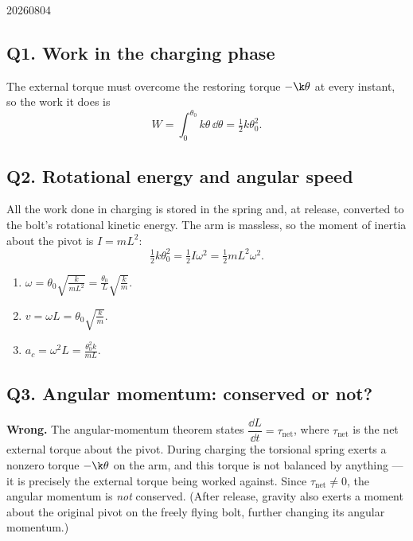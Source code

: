 \begin{solution}{20260804}

\subsection*{Q1. Work in the charging phase}

The external torque must overcome the restoring torque $-\k\theta$ at every instant, so the work it does is
\[
  W = \int_{0}^{\theta_{0}} k\theta \,\dd\theta
    = \boxed{\tfrac{1}{2}k\theta_{0}^{2}}.
\]

\subsection*{Q2. Rotational energy and angular speed}

All the work done in charging is stored in the spring and, at release, converted to the bolt's rotational kinetic energy.  The arm is massless, so the moment of inertia about the pivot is $I = mL^{2}$:
\[
  \tfrac{1}{2}k\theta_{0}^{2} = \tfrac{1}{2}I\omega^{2}
  = \tfrac{1}{2}mL^{2}\omega^{2}.
\]

\begin{enumerate}[label=\roman*.]
  \item $\displaystyle \omega = \theta_{0}\sqrt{\frac{k}{mL^{2}}} = \boxed{\frac{\theta_{0}}{L}\sqrt{\frac{k}{m}}}$.
  \item $\displaystyle v = \omega L = \boxed{\theta_{0}\sqrt{\frac{k}{m}}}$.
  \item $\displaystyle a_c = \omega^{2}L = \boxed{\frac{\theta_{0}^{2}k}{mL}}$.
\end{enumerate}

\subsection*{Q3. Angular momentum: conserved or not?}

\textbf{Wrong.}  The angular-momentum theorem states $\dfrac{\dd L}{\dd t} = \tau_{\text{net}}$, where $\tau_{\text{net}}$ is the net external torque about the pivot.  During charging the torsional spring exerts a nonzero torque $-\k\theta$ on the arm, and this torque is not balanced by anything --- it is precisely the external torque being worked against.  Since $\tau_{\text{net}} \ne 0$, the angular momentum is \emph{not} conserved.  (After release, gravity also exerts a moment about the original pivot on the freely flying bolt, further changing its angular momentum.)


\end{solution}
